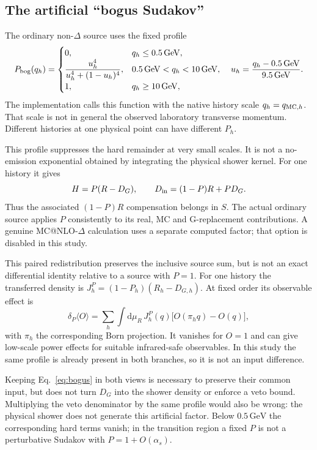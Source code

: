 \documentclass[11pt,a4paper]{article}
\makeatletter
\newcommand{\mcatnlo}{MC@NLO}
\newcommand{\dd}{\mathrm{d}}
\newcommand{\as}{\alpha_s}
\newcommand{\GeV}{\,\mathrm{GeV}}
\makeatother
\begin{document}
\subsection{The artificial ``bogus Sudakov''}
\label{sec:bogus}
The ordinary non-$\Delta$ source uses the fixed profile
\begin{equation}
 P_{\rm bog}(q_h)=
 \begin{cases}
 0,&q_h\le0.5\GeV,\\
 \displaystyle\frac{u_h^4}{u_h^4+(1-u_h)^4},
       &0.5\GeV<q_h<10\GeV,\\
 1,&q_h\ge10\GeV,
 \end{cases}
 \quad u_h=\frac{q_h-0.5\GeV}{9.5\GeV}.
 \label{eq:bogus}
\end{equation}
The implementation calls this function with the native history scale
$q_h=q_{{\rm MC},h}$. That scale is not in general the observed laboratory
transverse momentum. Different histories at one physical point can
have different $P_h$.

This profile suppresses the hard remainder at very small scales. It is
not a no-emission exponential obtained by integrating the physical
shower kernel. For one history it gives
\begin{equation}
 H=P(R-D_G),\qquad D_{\rm in}=(1-P)R+PD_G.
 \label{eq:bogussplit}
\end{equation}
Thus the associated $(1-P)R$ compensation belongs in $S$. The actual
ordinary source applies $P$ consistently to its real, MC and
G-replacement contributions. A genuine \mcatnlo{}-$\Delta$ calculation
uses a separate computed factor; that option is disabled in this study.

This paired redistribution preserves the inclusive source sum, but
is not an exact differential identity relative to a source with $P=1$.
For one history the transferred density is
$J_h^{P}=(1-P_h)(R_h-D_{G,h})$. At fixed order its observable effect is
\begin{equation}
 \delta_P\langle O\rangle=\sum_h\int\dd\mu_R\,
 J_h^{P}(q)\bigl[O(\pi_hq)-O(q)\bigr],
\end{equation}
with $\pi_h$ the corresponding Born projection. It vanishes for $O=1$ and can give low-scale power effects
for suitable infrared-safe observables. In this study the same profile
is already present in both branches, so it is not an input difference.

Keeping Eq.~\eqref{eq:bogus} in both views is necessary to preserve their
common input, but does not turn $D_G$ into the shower density or enforce
a veto bound. Multiplying the veto denominator by the same profile
would also be wrong: the physical shower does not generate this
artificial factor. Below $0.5\GeV$ the corresponding hard terms vanish;
in the transition region a fixed $P$ is not a perturbative Sudakov with
$P=1+O(\as)$.
\end{document}
